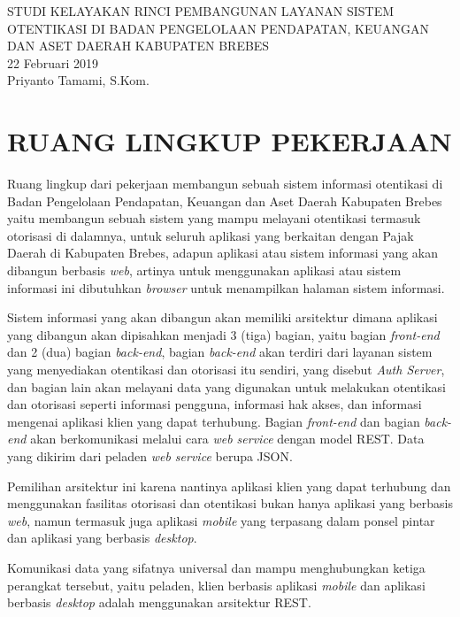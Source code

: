 \documentclass[pdftex,12pt, oneside]{article}
\begin{document}
%
\begin{center}
{\large STUDI KELAYAKAN RINCI PEMBANGUNAN LAYANAN SISTEM OTENTIKASI DI BADAN PENGELOLAAN PENDAPATAN, KEUANGAN DAN ASET DAERAH KABUPATEN BREBES}
\\[1cm]
22 Februari 2019\\
Priyanto Tamami, S.Kom.
\end{center}

\section{RUANG LINGKUP PEKERJAAN}

Ruang lingkup dari pekerjaan membangun sebuah sistem informasi otentikasi di Badan Pengelolaan Pendapatan, Keuangan dan Aset Daerah Kabupaten Brebes yaitu membangun sebuah sistem yang mampu melayani otentikasi termasuk otorisasi di dalamnya, untuk seluruh aplikasi yang berkaitan dengan Pajak Daerah di Kabupaten Brebes, adapun aplikasi atau sistem informasi yang akan dibangun berbasis \textit{web}, artinya untuk menggunakan aplikasi atau sistem informasi ini dibutuhkan \textit{browser} untuk menampilkan halaman sistem informasi.

Sistem informasi yang akan dibangun akan memiliki arsitektur dimana aplikasi yang dibangun akan dipisahkan menjadi 3 (tiga) bagian, yaitu bagian \textit{front-end} dan 2 (dua) bagian \textit{back-end}, bagian \textit{back-end} akan terdiri dari layanan sistem yang menyediakan otentikasi dan otorisasi itu sendiri, yang disebut \textit{Auth Server}, dan bagian lain akan melayani data yang digunakan untuk melakukan otentikasi dan otorisasi seperti informasi pengguna, informasi hak akses, dan informasi mengenai aplikasi klien yang dapat terhubung. Bagian \textit{front-end} dan bagian \textit{back-end} akan berkomunikasi melalui cara \textit{web service} dengan model REST. Data yang dikirim dari peladen \textit{web service} berupa JSON.

Pemilihan arsitektur ini karena nantinya aplikasi klien yang dapat terhubung dan menggunakan fasilitas otorisasi dan otentikasi bukan hanya aplikasi yang berbasis \textit{web}, namun termasuk juga aplikasi \textit{mobile} yang terpasang dalam ponsel pintar dan aplikasi yang berbasis \textit{desktop}.

Komunikasi data yang sifatnya universal dan mampu menghubungkan ketiga perangkat tersebut, yaitu peladen, klien berbasis aplikasi \textit{mobile} dan aplikasi berbasis \textit{desktop} adalah menggunakan arsitektur REST.
\end{document}
